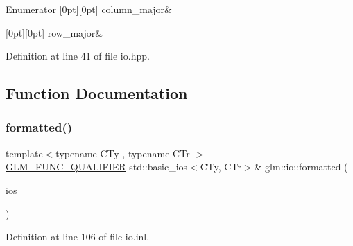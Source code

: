 \begin{DoxyEnumFields}{Enumerator}
[0pt][0pt]{}\mbox{\label{namespaceglm_1_1io_a3497781803fe594a37177e05ab2a795faab661780f7f081ee11c34be9b0742229}} 
column\+\_\+major&\\
\hline

[0pt][0pt]{}\mbox{\label{namespaceglm_1_1io_a3497781803fe594a37177e05ab2a795fad080bb2f932ea4078fd0fc10ea1c991c}} 
row\+\_\+major&\\
\hline

\end{DoxyEnumFields}


Definition at line 41 of file io.\+hpp.



\subsection{Function Documentation}
\mbox{\label{namespaceglm_1_1io_aa31ec433f6039e5bd35f0f58b37bef83}} 
\subsubsection{\texorpdfstring{formatted()}{formatted()}\hspace{0.1cm}{\footnotesize\ttfamily [1/2]}}
{\footnotesize\ttfamily template$<$typename C\+Ty , typename C\+Tr $>$ \\
\mbox{\hyperlink{setup_8hpp_a33fdea6f91c5f834105f7415e2a64407}{G\+L\+M\+\_\+\+F\+U\+N\+C\+\_\+\+Q\+U\+A\+L\+I\+F\+I\+ER}} std\+::basic\+\_\+ios$<$C\+Ty, C\+Tr$>$\& glm\+::io\+::formatted (\begin{DoxyParamCaption}\item[{std\+::basic\+\_\+ios$<$ C\+Ty, C\+Tr $>$ \&}]{ios }\end{DoxyParamCaption})}



Definition at line 106 of file io.\+inl.

